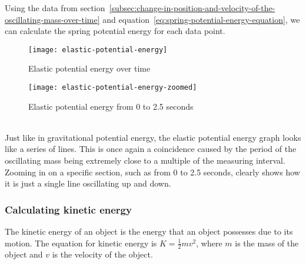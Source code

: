 \documentclass[titlepage]{article}
\begin{document}
                Using the data from section~\ref{subsec:change-in-position-and-velocity-of-the-oscillating-mass-over-time} and equation~\ref{eq:spring-potential-energy-equation}, we can calculate the spring potential energy for each data point.
                
                \begin{minipage}{.5\textwidth}
                    \begin{figure}[H]
                        \centering
                        \texttt{[image: elastic-potential-energy]}
                        \caption{Elastic potential energy over time}
                        \label{fig:elastic-potential-energy}
                    \end{figure}
                \end{minipage}%
                \begin{minipage}{.5\textwidth}
                    \begin{figure}[H]
                        \centering
                        \texttt{[image: elastic-potential-energy-zoomed]}
                        \caption{Elastic potential energy from 0 to 2.5 seconds}
                        \label{fig:elastic-potential-energy-zoomed}
                    \end{figure}
                \end{minipage}\\
                
                Just like in gravitational potential energy, the elastic potential energy graph looks like a series of lines.
                This is once again a coincidence caused by the period of the oscillating mass being extremely close to a multiple of the measuring interval.
                Zooming in on a specific section, such as from 0 to 2.5 seconds, clearly shows how it is just a single line oscillating up and down.
            
            \subsubsection{Calculating kinetic energy}
                
                The kinetic energy of an object is the energy that an object possesses due to its motion.
                The equation for kinetic energy is $K = \frac{1}{2}mv^2$, where $m$ is the mass of the object and $v$ is the velocity of the object.
                
\end{document}
